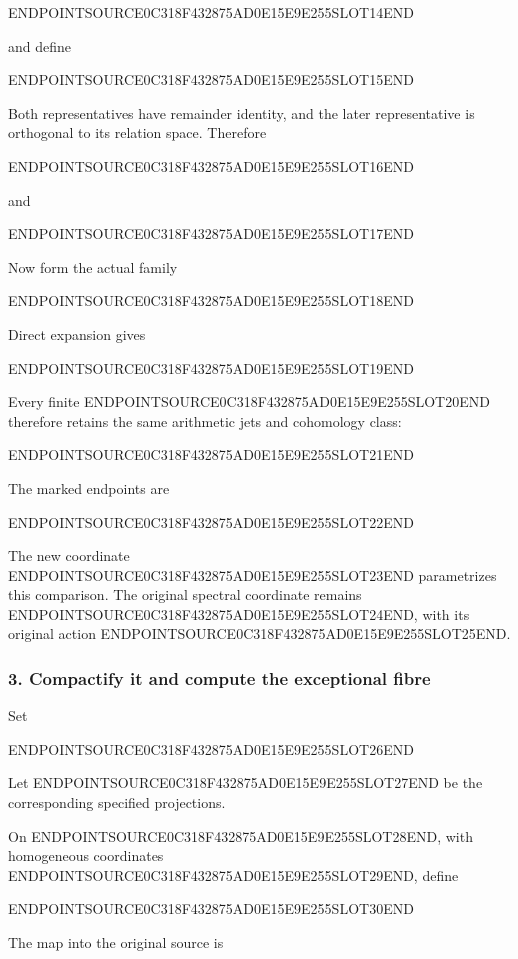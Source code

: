 ENDPOINTSOURCE0C318F432875AD0E15E9E255SLOT14END

and define

ENDPOINTSOURCE0C318F432875AD0E15E9E255SLOT15END

Both representatives have remainder identity, and the later representative is orthogonal to its relation space. Therefore

ENDPOINTSOURCE0C318F432875AD0E15E9E255SLOT16END

and

ENDPOINTSOURCE0C318F432875AD0E15E9E255SLOT17END

Now form the actual family

ENDPOINTSOURCE0C318F432875AD0E15E9E255SLOT18END

Direct expansion gives

ENDPOINTSOURCE0C318F432875AD0E15E9E255SLOT19END

Every finite ENDPOINTSOURCE0C318F432875AD0E15E9E255SLOT20END therefore retains the same arithmetic jets and cohomology class:

ENDPOINTSOURCE0C318F432875AD0E15E9E255SLOT21END

The marked endpoints are

ENDPOINTSOURCE0C318F432875AD0E15E9E255SLOT22END

The new coordinate ENDPOINTSOURCE0C318F432875AD0E15E9E255SLOT23END parametrizes this comparison. The original spectral coordinate remains ENDPOINTSOURCE0C318F432875AD0E15E9E255SLOT24END, with its original action ENDPOINTSOURCE0C318F432875AD0E15E9E255SLOT25END.

\subsubsection{3. Compactify it and compute the exceptional fibre}\label{endpoint-curvature_original--compactify-it-and-compute-the-exceptional-fibre}

Set

ENDPOINTSOURCE0C318F432875AD0E15E9E255SLOT26END

Let ENDPOINTSOURCE0C318F432875AD0E15E9E255SLOT27END be the corresponding specified projections.

On ENDPOINTSOURCE0C318F432875AD0E15E9E255SLOT28END, with homogeneous coordinates ENDPOINTSOURCE0C318F432875AD0E15E9E255SLOT29END, define

ENDPOINTSOURCE0C318F432875AD0E15E9E255SLOT30END

The map into the original source is


